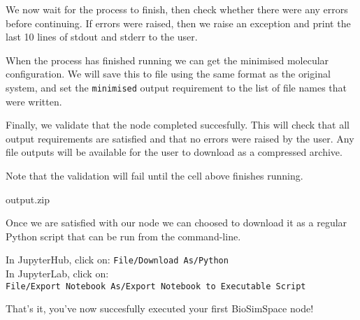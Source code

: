\begin{Shaded}
\begin{Highlighting}[]
\OperatorTok{=}\OperatorTok{=}\NormalTok{))}
\end{Highlighting}
\end{Shaded}

We now wait for the process to finish, then check whether there were any
errors before continuing. If errors were raised, then we raise an
exception and print the last 10 lines of stdout and stderr to the user.

\begin{Shaded}
\begin{Highlighting}[]

    \NormalTok{))}
    \NormalTok{))}
     \NormalTok{(}\NormalTok{)}
\end{Highlighting}
\end{Shaded}

When the process has finished running we can get the minimised molecular
configuration. We will save this to file using the same format as the
original system, and set the \texttt{minimised} output requirement to
the list of file names that were written.

\begin{Shaded}
\begin{Highlighting}[]
\NormalTok{,}
\end{Highlighting}
\end{Shaded}

Finally, we validate that the node completed succesfully. This will
check that all output requirements are satisfied and that no errors were
raised by the user. Any file outputs will be available for the user to
download as a compressed archive.

Note that the validation will fail until the cell above finishes
running.

\begin{Shaded}
\begin{Highlighting}[]
\end{Highlighting}
\end{Shaded}

output.zip

Once we are satisfied with our node we can choosed to download it as a
regular Python script that can be run from the command-line.

In JupyterHub, click on: \texttt{File/Download\ As/Python}\\
In JupyterLab, click on:
\texttt{File/Export\ Notebook\ As/Export\ Notebook\ to\ Executable\ Script}

That's it, you've now succesfully executed your first BioSimSpace node!
